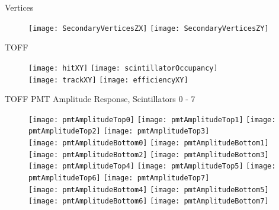 \documentclass[11pt]{beamer}
\begin{document}
\begin{frame}{Vertices}
\begin{figure}
\centering
\texttt{[image: SecondaryVerticesZX]}
\texttt{[image: SecondaryVerticesZY]}
\end{figure}
\end{frame}

\begin{frame}{TOFF}
\begin{figure}
\centering
\texttt{[image: hitXY]}
\texttt{[image: scintillatorOccupancy]} \\
\texttt{[image: trackXY]}
\texttt{[image: efficiencyXY]}
\end{figure}
\end{frame}

\begin{frame}{TOFF PMT Amplitude Response, Scintillators 0 - 7}
\begin{figure}
\centering
\texttt{[image: pmtAmplitudeTop0]}
\texttt{[image: pmtAmplitudeTop1]}
\texttt{[image: pmtAmplitudeTop2]}
\texttt{[image: pmtAmplitudeTop3]} \\ 
\texttt{[image: pmtAmplitudeBottom0]}
\texttt{[image: pmtAmplitudeBottom1]}
\texttt{[image: pmtAmplitudeBottom2]}
\texttt{[image: pmtAmplitudeBottom3]} \\
\texttt{[image: pmtAmplitudeTop4]}
\texttt{[image: pmtAmplitudeTop5]}
\texttt{[image: pmtAmplitudeTop6]}
\texttt{[image: pmtAmplitudeTop7]} \\
\texttt{[image: pmtAmplitudeBottom4]}
\texttt{[image: pmtAmplitudeBottom5]}
\texttt{[image: pmtAmplitudeBottom6]}
\texttt{[image: pmtAmplitudeBottom7]} \\
\end{figure}
\end{frame}
\end{document}
